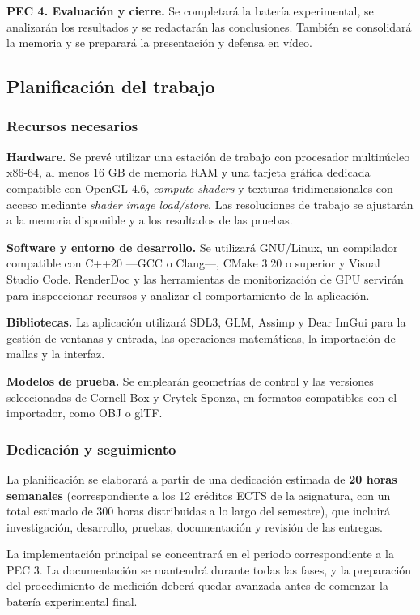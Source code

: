 \textbf{PEC 4. Evaluación y cierre.} Se completará la batería experimental, se analizarán los resultados y se redactarán las conclusiones. También se consolidará la memoria y se preparará la presentación y defensa en vídeo.

\subsection{Planificación del trabajo}

\subsubsection{Recursos necesarios}

\textbf{Hardware.} Se prevé utilizar una estación de trabajo con procesador multinúcleo x86-64, al menos 16 GB de memoria RAM y una tarjeta gráfica dedicada compatible con OpenGL 4.6, \textit{compute shaders} y texturas tridimensionales con acceso mediante \textit{shader image load/store}. Las resoluciones de trabajo se ajustarán a la memoria disponible y a los resultados de las pruebas.

\textbf{Software y entorno de desarrollo.} Se utilizará GNU/Linux, un compilador compatible con C++20 ---GCC o Clang---, CMake 3.20 o superior y Visual Studio Code. RenderDoc y las herramientas de monitorización de GPU servirán para inspeccionar recursos y analizar el comportamiento de la aplicación.

\textbf{Bibliotecas.} La aplicación utilizará SDL3, GLM, Assimp y Dear ImGui para la gestión de ventanas y entrada, las operaciones matemáticas, la importación de mallas y la interfaz.

\textbf{Modelos de prueba.} Se emplearán geometrías de control y las versiones seleccionadas de Cornell Box y Crytek Sponza, en formatos compatibles con el importador, como OBJ o glTF.

\subsubsection{Dedicación y seguimiento}

La planificación se elaborará a partir de una dedicación estimada de \textbf{20 horas semanales} (correspondiente a los 12 créditos ECTS de la asignatura, con un total estimado de 300 horas distribuidas a lo largo del semestre), que incluirá investigación, desarrollo, pruebas, documentación y revisión de las entregas.

La implementación principal se concentrará en el periodo correspondiente a la PEC 3. La documentación se mantendrá durante todas las fases, y la preparación del procedimiento de medición deberá quedar avanzada antes de comenzar la batería experimental final.

